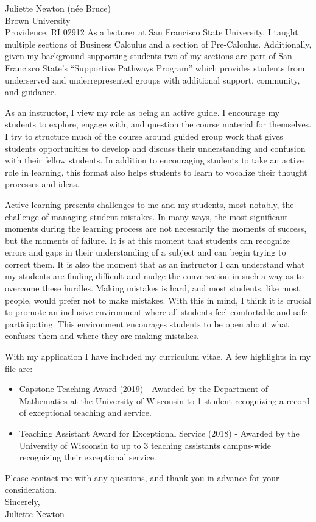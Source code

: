 \documentclass[11pt]{brownletter}
\begin{document}
\begin{letter}{Juliette Newton (n\'{e}e Bruce)\\ 
               Brown University\\ 
               Providence, RI 02912}
As a lecturer at San Francisco State University, I taught multiple sections of Business Calculus and a section of Pre-Calculus. Additionally, given my background supporting students two of my sections are part of San Francisco State's ``Supportive Pathways Program'' which provides students from underserved and underrepresented groups with additional support, community, and guidance. 


As an instructor, I view my role as being an active guide. I encourage my students to explore, engage with, and question the course material for themselves. I try to structure much of the course around guided group work that gives students opportunities to develop and discuss their understanding and confusion with their fellow students. In addition to encouraging students to take an active role in learning, this format also helps students to learn to vocalize their thought processes and ideas.

Active learning presents challenges to me and my students, most notably, the challenge of managing student mistakes. In many ways, the most significant moments during the learning process are not necessarily the moments of success, but the moments of failure. It is at this moment that students can recognize errors and gaps in their understanding of a subject and can begin trying to correct them. It is also the moment that as an instructor I can understand what my students are finding difficult and nudge the conversation in such a way as to overcome these hurdles.
Making mistakes is hard, and most students, like most people, would prefer not to make mistakes. With this in mind, I think it is crucial to promote an inclusive environment where all students feel comfortable and safe participating. This environment encourages students to be open about what confuses them and where they are making mistakes.

With my application I have included my curriculum vitae. A few highlights in my file are:
\begin{itemize}

\item Capstone Teaching Award (2019) - Awarded by the Department of Mathematics at the University of Wisconsin to 1 student recognizing a record of exceptional teaching and service.
\item Teaching Assistant Award for Exceptional Service  (2018) - Awarded by the University of Wisconsin to up to 3 teaching assistants campus-wide recognizing their exceptional service.

\end{itemize}

Please contact me with any questions, and thank you in advance for your consideration.
\vspace{.1 in}
\\
Sincerely,
\\
Juliette Newton




\end{letter}
\end{document}
